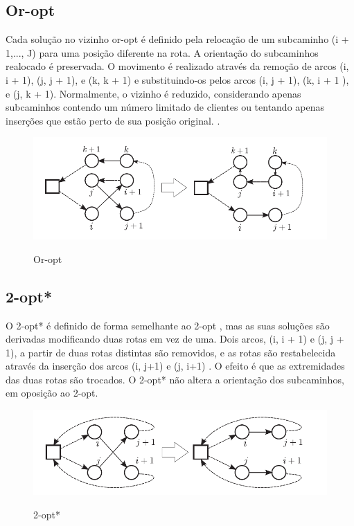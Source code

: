 \subsection{Or-opt}

 Cada solução no vizinho or-opt é definido pela relocação de um subcaminho (i + 1,..., J) para uma posição diferente na rota. A orientação do subcaminhos realocado é preservada. O movimento é realizado através da remoção de arcos (i, i + 1), (j, j + 1), e (k, k + 1) e substituindo-os pelos arcos (i, j + 1), (k, i + 1 ), e (j, k + 1). Normalmente, o vizinho é reduzido, considerando apenas subcaminhos contendo um número limitado de clientes ou tentando apenas inserções que estão perto de sua posição original. \cite{braysy05}. 

\begin{figure}[ht!]
\centering
\includegraphics[scale=0.7]{figuras/opt-2.PNG}
\label{opt-2}
\caption{Or-opt}
\end{figure}

\subsection{2-opt*}

 O 2-opt* é definido de forma semelhante ao 2-opt , mas as suas soluções são derivadas modificando duas rotas em vez de uma. Dois arcos, (i, i + 1) e (j, j + 1), a partir de duas rotas distintas são removidos, e as rotas são restabelecida através da inserção dos arcos (i, j+1) e (j, i+1) . O efeito é que as extremidades das duas rotas são trocados. O 2-opt* não altera a orientação dos subcaminhos, em oposição ao 2-opt.

\begin{figure}[ht!]
\centering
\includegraphics[scale=0.7]{figuras/opt-3.PNG}
\label{opt-3}
\caption{2-opt*}
\end{figure}

